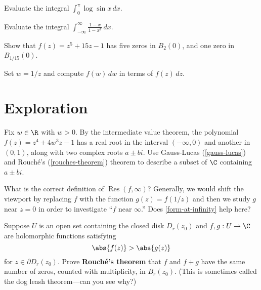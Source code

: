\documentclass{homework}
\DeclareMathOperator{\Res}{Res}
\begin{document}
\begin{problem}
  Evaluate the integral $\displaystyle \int_0^\pi \log \sin x \, dx$.
\end{problem}

\begin{problem}
  Evaluate the integral $\displaystyle\int_{-\infty}^{\infty} \frac{1-x}{1-x^7} \, dx$.
\end{problem}

\begin{problem}
  Show that $f(z) = z^5 + 15z - 1$ has five zeros in $B_2(0)$, and one zero in $B_{1/15}(0)$.
\end{problem}

\begin{problem}\label{form-at-infinity}Set $w = 1/z$ and compute $f(w) \, dw$ in terms of $f(z) \, dz$.
\end{problem}

\section{Exploration}

\begin{problem}
  Fix $w \in \R$ with $w>0$.  By the intermediate value theorem, the
  polynomial $f(z) = z^4 + 4w^3 z - 1$ has a real root in the interval
  $(-\infty,0)$ and another in $(0,1)$, along with two complex roots
  $a \pm bi$.  Use Gauss-Lucas (\ref{gauss-lucas}) and Rouch\'e's
  (\ref{rouches-theorem}) theorem to describe a subset of $\C$
  containing $a\pm bi$.
\end{problem}

\begin{problem}
  What is the correct definition of $\Res(f,\infty)$?  Generally, we
  would shift the viewport by replacing $f$ with the function
  $g(z) = f(1/z)$ and then we study $g$ near $z = 0$ in order to
  investigate ``$f$ near $\infty$.''  Does \ref{form-at-infinity} help
  here?
\end{problem}

\begin{problem}\label{rouches-theorem}Suppose $U$ is an open set containing the closed disk $D_r(z_0)$ and
  $f, g : U \to \C$ are holomorphic functions satisfying
  \[
    \abs{f(z)} > \abs{g(z)}
  \]
  for $z \in \partial D_r(z_0)$.  Prove \textbf{Rouch\'e's theorem}
  that $f$ and $f+g$ have the same number of zeros, counted with
  multiplicity, in $B_r(z_0)$.  (This is sometimes called the dog
  leash theorem---can you see why?)
\end{problem}
\end{document}
